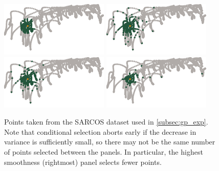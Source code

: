 \documentclass[review,supplement,onefignum,onetabnum]{siamonline220329}
\begin{document}
\begin{figure}[H]
  \centering
  \includegraphics{figures/precompiled/sarcos1/points_1.pdf}%
  \quad
  \includegraphics{figures/precompiled/sarcos1/points_2.pdf}%
  \quad
  \includegraphics{figures/precompiled/sarcos1/points_3.pdf}%
  \quad
  \includegraphics{figures/precompiled/sarcos1/points_4.pdf}%
  \caption{
    Points taken from the SARCOS dataset used in \cref{subsec:gp_exp}.
    Note that conditional selection aborts early if the decrease in
    variance is sufficiently small, so there may not be the same number
    of points selected between the panels. In particular, the highest
    smoothness (rightmost) panel selects fewer points.
  }
\end{figure}
\end{document}
